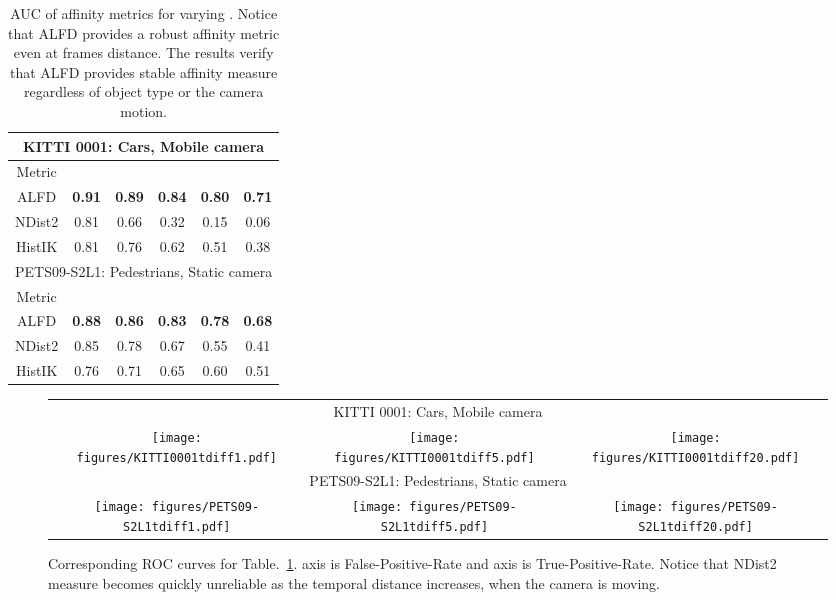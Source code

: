 \documentclass[10pt,twocolumn,letterpaper]{article}
\begin{document}
\begin{table}[t]
\begin{center}
{\scriptsize
\begin{tabular}{| c || c | c | c | c | c |}
\hline
\multicolumn{6}{|c|}{KITTI 0001: Cars, Mobile camera} \\
\hline
Metric & & & & &  \\ 
\hline
ALFD & \textbf{0.91} & \textbf{0.89} & \textbf{0.84} & \textbf{0.80} & \textbf{0.71} \\
NDist2 & 0.81 & 0.66 & 0.32 & 0.15 & 0.06 \\
HistIK & 0.81 & 0.76 & 0.62 & 0.51 & 0.38  \\
\hline
\hline
\multicolumn{6}{|c|}{PETS09-S2L1: Pedestrians, Static camera} \\
\hline
Metric & & & & &  \\ 
\hline
ALFD & \textbf{0.88} & \textbf{0.86} & \textbf{0.83} & \textbf{0.78} & \textbf{0.68} \\
NDist2 & 0.85 & 0.78 & 0.67 & 0.55 & 0.41\\
HistIK & 0.76 & 0.71 & 0.65 & 0.60 & 0.51  \\
\hline
\end{tabular}
}
\caption{AUC of affinity metrics for varying . Notice that ALFD provides a robust affinity metric even at  frames distance. The results verify that ALFD provides stable affinity measure regardless of object type or the camera motion.}
\label{tab:alfd}
\end{center}
 \end{table}

\begin{figure}[t]
\begin{center}
{\scriptsize
\begin{tabular}{c@{\hspace{1mm}}c@{\hspace{1mm}}c}
\multicolumn{3}{c}{KITTI 0001: Cars, Mobile camera} \\
\texttt{[image: figures/KITTI0001tdiff1.pdf]} &
\texttt{[image: figures/KITTI0001tdiff5.pdf]} &
\texttt{[image: figures/KITTI0001tdiff20.pdf]} \\
\multicolumn{3}{c}{PETS09-S2L1: Pedestrians, Static camera} \\
\texttt{[image: figures/PETS09-S2L1tdiff1.pdf]} &
\texttt{[image: figures/PETS09-S2L1tdiff5.pdf]} &
\texttt{[image: figures/PETS09-S2L1tdiff20.pdf]} \\
\end{tabular}
}
\end{center}
\caption{Corresponding ROC curves for Table.~\ref{tab:alfd}.  axis is False-Positive-Rate and  axis is True-Positive-Rate. Notice that NDist2 measure becomes quickly unreliable as the temporal distance increases, when the camera is moving.}
\label{fig:alfdanal} \end{figure}
\end{document}
